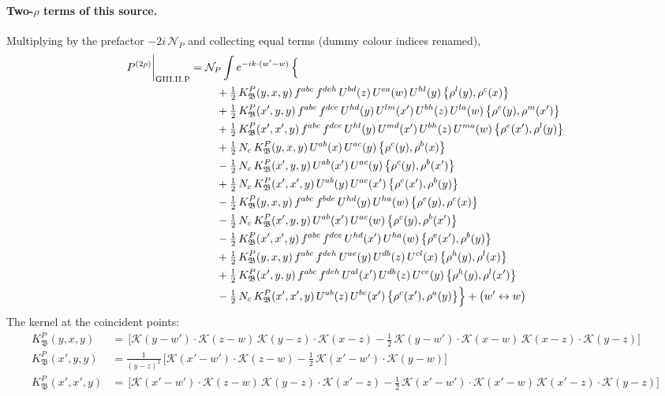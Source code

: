 \documentclass[10pt]{article}
\numberwithin{equation}{section}
\newcommand{\KK}{\mathcal K}
\newcommand{\NP}{\mathcal N_{P}}
\begin{document}
\paragraph{Two-$\rho$ terms of this source.} Multiplying by the prefactor $-2i\,\NP$ and collecting equal terms (dummy colour indices renamed),
\begin{align}
P^{(2\rho)}\bigg|_{\rm GIII.II.P}={}&\NP\int e^{-ik\cdot(w'-w)}\,\Big\{\notag\\
&\quad +\tfrac12\,K^{P}_{\mathfrak B}(y,x,y)\,f^{abc}\,f^{deh}\,U^{bd}(z)\,U^{ea}(w)\,U^{hl}(y)\,\big\{\rho^{l}(y),\rho^{c}(x)\big\}\notag\\
&\quad +\tfrac12\,K^{P}_{\mathfrak B}(x',y,y)\,f^{abc}\,f^{dce}\,U^{hd}(y)\,U^{lm}(x')\,U^{bh}(z)\,U^{la}(w)\,\big\{\rho^{e}(y),\rho^{m}(x')\big\}\notag\\
&\quad +\tfrac12\,K^{P}_{\mathfrak B}(x',x',y)\,f^{abc}\,f^{dce}\,U^{hl}(y)\,U^{md}(x')\,U^{bh}(z)\,U^{ma}(w)\,\big\{\rho^{e}(x'),\rho^{l}(y)\big\}\notag\\
&\quad +\tfrac12\,N_{c}\,K^{P}_{\mathfrak B}(y,x,y)\,U^{ab}(x)\,U^{ac}(y)\,\big\{\rho^{c}(y),\rho^{b}(x)\big\}\notag\\
&\quad -\tfrac12\,N_{c}\,K^{P}_{\mathfrak B}(x',y,y)\,U^{ab}(x')\,U^{ac}(y)\,\big\{\rho^{c}(y),\rho^{b}(x')\big\}\notag\\
&\quad +\tfrac12\,N_{c}\,K^{P}_{\mathfrak B}(x',x',y)\,U^{ab}(y)\,U^{ac}(x')\,\big\{\rho^{c}(x'),\rho^{b}(y)\big\}\notag\\
&\quad -\tfrac12\,K^{P}_{\mathfrak B}(y,x,y)\,f^{abc}\,f^{bde}\,U^{hd}(y)\,U^{ha}(w)\,\big\{\rho^{e}(y),\rho^{c}(x)\big\}\notag\\
&\quad -\tfrac12\,N_{c}\,K^{P}_{\mathfrak B}(x',y,y)\,U^{ab}(x')\,U^{ac}(w)\,\big\{\rho^{c}(y),\rho^{b}(x')\big\}\notag\\
&\quad -\tfrac12\,K^{P}_{\mathfrak B}(x',x',y)\,f^{abc}\,f^{dce}\,U^{hd}(x')\,U^{ha}(w)\,\big\{\rho^{e}(x'),\rho^{b}(y)\big\}\notag\\
&\quad +\tfrac12\,K^{P}_{\mathfrak B}(y,x,y)\,f^{abc}\,f^{deh}\,U^{ae}(y)\,U^{db}(z)\,U^{cl}(x)\,\big\{\rho^{h}(y),\rho^{l}(x)\big\}\notag\\
&\quad +\tfrac12\,K^{P}_{\mathfrak B}(x',y,y)\,f^{abc}\,f^{deh}\,U^{al}(x')\,U^{db}(z)\,U^{ce}(y)\,\big\{\rho^{h}(y),\rho^{l}(x')\big\}\notag\\
&\quad -\tfrac12\,N_{c}\,K^{P}_{\mathfrak B}(x',x',y)\,U^{ab}(z)\,U^{bc}(x')\,\big\{\rho^{c}(x'),\rho^{a}(y)\big\}\Big\}+\big(w'\leftrightarrow w\big)\label{B:eq:res-GIII.II.P}
\end{align}
The kernel at the coincident points:
\begin{align*}
K^{P}_{\mathfrak B}(y,x,y)&=\,\Big[\KK(y-w')\cdot\KK(z-w)\,\KK(y-z)\cdot\KK(x-z)-\frac{1}{2}\,\KK(y-w')\cdot\KK(x-w)\,\KK(x-z)\cdot\KK(y-z)\Big]\\K^{P}_{\mathfrak B}(x',y,y)&=\frac{1}{(y-z)^2}\,\Big[\KK(x'-w')\cdot\KK(z-w)-\frac{1}{2}\,\KK(x'-w')\cdot\KK(y-w)\Big]\\K^{P}_{\mathfrak B}(x',x',y)&=\,\Big[\KK(x'-w')\cdot\KK(z-w)\,\KK(y-z)\cdot\KK(x'-z)-\frac{1}{2}\,\KK(x'-w')\cdot\KK(x'-w)\,\KK(x'-z)\cdot\KK(y-z)\Big]
\end{align*}
\end{document}
